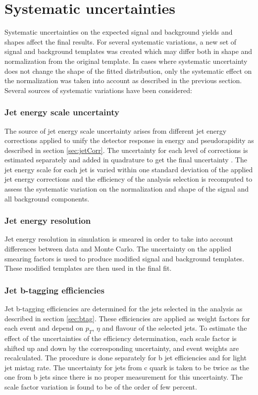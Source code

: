 
\section{Systematic uncertainties}
\label{sec:syst}

Systematic uncertainties on the expected signal and background yields and shapes affect
the final results. For several systematic variations, a new set of signal and background templates was created which may differ both in shape and normalization from the original template. 
In cases where systematic uncertainty does not change the shape of the fitted distribution, only the systematic effect on the normalization was taken into account as described in the previous section. Several sources of systematic variations have been considered:
\subsubsection*{Jet energy scale uncertainty}
		The source of jet energy scale uncertainty arises from different jet energy corrections applied to unify the detector response in energy and pseudorapidity as described in section \ref{sec:jetCorr}. The uncertainty for each level of corrections is estimated separately and added in quadrature to get the final uncertainty \cite{Chatrchyan:2011ds}. The jet energy scale for each jet is varied within one standard deviation of the applied jet energy corrections and the efficiency of the analysis selection is recomputed to assess the systematic variation on the normalization and shape of the signal and all background components.
\subsubsection*{Jet energy resolution}
        Jet energy resolution in simulation is smeared in order to take into account differences between data and Monte Carlo. The uncertainty on the applied smearing factors is used to produce modified signal and background templates.  These modified templates are then used in the final fit.
\subsubsection*{Jet b-tagging efficiencies}
        Jet b-tagging efficiencies are determined for the jets selected in the analysis as described in section \ref{sec:btag}. These efficiencies are applied as weight factors for each event and depend on $p_T$, $\eta$ and flavour of the selected jets. To estimate the effect of the uncertainties of the efficiency determination, each scale factor is shifted up and down by the corresponding uncertainty, and event weights are recalculated. The procedure is done separately for b jet efficiencies and for light jet mistag rate. The uncertainty for jets from c quark is taken to be twice as the one from b jets since there is no proper measurement for this uncertainty. The scale factor variation is found to be of the order of few percent. 

